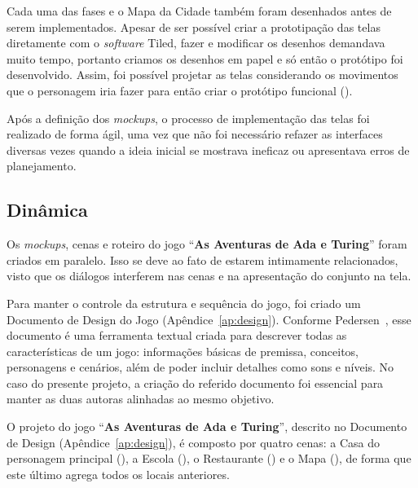 
Cada uma das fases e o Mapa da Cidade também foram desenhados antes de serem implementados. Apesar de ser possível criar a prototipação das telas diretamente com o \textit{software} Tiled, fazer e modificar os desenhos demandava muito tempo, portanto criamos os desenhos em papel e só então o protótipo foi desenvolvido. Assim, foi possível projetar as telas considerando os movimentos que o personagem iria fazer para então criar o protótipo funcional ().



Após a definição dos \textit{mockups}, o processo de implementação das telas foi realizado de forma ágil, uma vez que não foi necessário refazer as interfaces diversas vezes quando a ideia inicial se mostrava ineficaz ou apresentava erros de planejamento.

\subsection{Dinâmica} \label{ssec:dinamica}

Os \textit{mockups}, cenas e roteiro do jogo “\textbf{As Aventuras de Ada e Turing}” foram criados em paralelo. Isso se deve ao fato de estarem intimamente relacionados, visto que os diálogos interferem nas cenas e na apresentação do conjunto na tela. 

Para manter o controle da estrutura e sequência do jogo, foi criado um Documento de Design do Jogo (Apêndice~\ref{ap:design}). Conforme Pedersen~\cite{pedersen2009game}, esse documento é uma ferramenta textual criada para descrever todas as características de um jogo: informações básicas de premissa, conceitos, personagens e cenários, além de poder incluir detalhes como sons e níveis. No caso do presente projeto, a criação do referido documento foi essencial para manter as duas autoras alinhadas ao mesmo objetivo.

O projeto do jogo “\textbf{As Aventuras de Ada e Turing}”, descrito no Documento de Design (Apêndice~\ref{ap:design}), é composto por quatro cenas: a Casa do personagem principal (), a Escola (), o Restaurante () e o Mapa (), de forma que este último agrega todos os locais anteriores.

